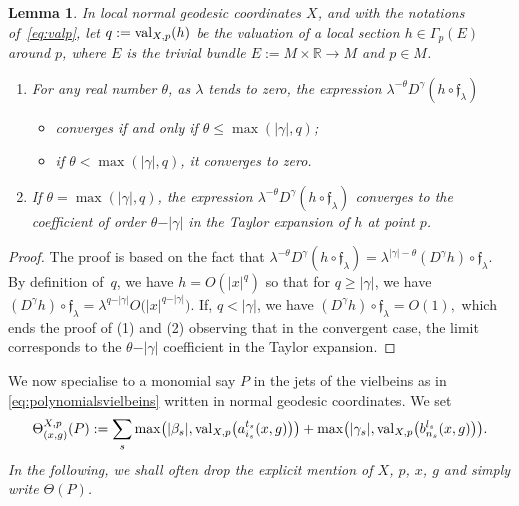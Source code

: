 \documentclass[pdftex]{sigma}
\numberwithin{equation}{section}
\newtheorem{lem}[thm]{Lemma}
\theoremstyle{definition}
\newcommand{\R}{\mathbb R}
\begin{document}
\begin{lem}\label{lem:lambdadeltaB}
	In local normal geodesic coordinates $X$, and with the notations of~\eqref{eq:valp}, let
$	q:={\rm val}_{X,p} (h)$ be the valuation of a local section $h\in \Gamma_p(E)$ around $p$, where $E$ is the trivial bundle $E:=M\times\R\to M$ and $p\in M$.
	\begin{enumerate}\itemsep=0pt
		\item[$1.$] For any real number $\theta$, as $\lambda$ tends to zero, the expression $ \lambda^{-\theta}D^\gamma(h\circ \mathfrak{f}_\lambda)$
		\begin{itemize}\itemsep=0pt
			\item converges if and only if $ \theta\leq \max (\vert\gamma\vert, q)$;
			\item if $\theta <\max (\vert\gamma\vert, q)$, it converges to zero.
		\end{itemize}
		\item[$2.$] If $\theta=\max (\vert\gamma\vert, q)$, the expression $ \lambda^{-\theta}D^\gamma(h\circ \mathfrak{f}_\lambda)$ converges to the coefficient of order $\theta-\vert \gamma\vert$ in the Taylor expansion of $h$ at point $p$.
	\end{enumerate}
\end{lem}
\begin{proof} The proof is based on the fact that $\lambda^{-\theta}D^\gamma(h\circ\mathfrak{f}_\lambda)=\lambda^{\vert\gamma\vert-\theta} (D^\gamma h)\circ \mathfrak{f}_\lambda$. By definition of~$q$, we have $h=O(\vert x\vert^q)$ so that for $q\geq \vert\gamma\vert$, we have $ (D^\gamma h)\circ \mathfrak{f}_\lambda =\lambda^{q-\vert\gamma\vert}O\bigl(\vert x\vert^{q-\vert\gamma\vert}\bigr)$. If, $q< \vert\gamma\vert$, we have $(D^\gamma h)\circ \mathfrak{f}_\lambda =O(1),$ which ends the proof of (1) and (2) observing that in the convergent case, the limit corresponds to the $\theta-\vert \gamma \vert$ coefficient in the Taylor expansion.
\end{proof}

 We now specialise to a monomial {say $P$} in the jets of the vielbeins as in \eqref{eq:polynomialsvielbeins} written in normal geodesic coordinates. We set
 \begin{equation*} %
 \Theta^{X, p}_{(x, g)}{(P)}:={\sum_s \max \bigl(|\beta_s|, {\rm val}_{X,p}\bigl(a_{i_s}^{t_s}(x,g)\bigr)\bigr)+ \max \bigl(|\gamma_s|, {\rm val}_{X,p}\bigl(b_{n_s}^{l_s}(x,g) \bigr)\bigr)}.
\end{equation*}
{\it In the following, we shall often drop the explicit mention of $X$, $p$, $x$, $g$ and simply write $\Theta (P)$.}
\end{document}
